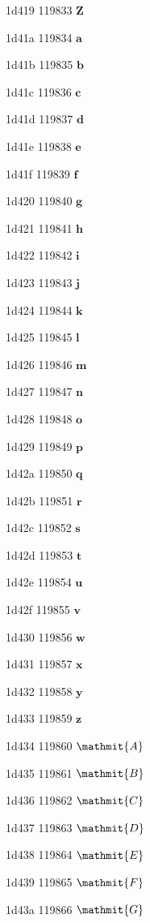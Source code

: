 \documentclass[11pt]{article}
\begin{document}
1d419 119833 \ensuremath{\mathbf{Z}}

1d41a 119834 \ensuremath{\mathbf{a}}

1d41b 119835 \ensuremath{\mathbf{b}}

1d41c 119836 \ensuremath{\mathbf{c}}

1d41d 119837 \ensuremath{\mathbf{d}}

1d41e 119838 \ensuremath{\mathbf{e}}

1d41f 119839 \ensuremath{\mathbf{f}}

1d420 119840 \ensuremath{\mathbf{g}}

1d421 119841 \ensuremath{\mathbf{h}}

1d422 119842 \ensuremath{\mathbf{i}}

1d423 119843 \ensuremath{\mathbf{j}}

1d424 119844 \ensuremath{\mathbf{k}}

1d425 119845 \ensuremath{\mathbf{l}}

1d426 119846 \ensuremath{\mathbf{m}}

1d427 119847 \ensuremath{\mathbf{n}}

1d428 119848 \ensuremath{\mathbf{o}}

1d429 119849 \ensuremath{\mathbf{p}}

1d42a 119850 \ensuremath{\mathbf{q}}

1d42b 119851 \ensuremath{\mathbf{r}}

1d42c 119852 \ensuremath{\mathbf{s}}

1d42d 119853 \ensuremath{\mathbf{t}}

1d42e 119854 \ensuremath{\mathbf{u}}

1d42f 119855 \ensuremath{\mathbf{v}}

1d430 119856 \ensuremath{\mathbf{w}}

1d431 119857 \ensuremath{\mathbf{x}}

1d432 119858 \ensuremath{\mathbf{y}}

1d433 119859 \ensuremath{\mathbf{z}}

1d434 119860 \ensuremath{\mathmit{A}}

1d435 119861 \ensuremath{\mathmit{B}}

1d436 119862 \ensuremath{\mathmit{C}}

1d437 119863 \ensuremath{\mathmit{D}}

1d438 119864 \ensuremath{\mathmit{E}}

1d439 119865 \ensuremath{\mathmit{F}}

1d43a 119866 \ensuremath{\mathmit{G}}
\end{document}
